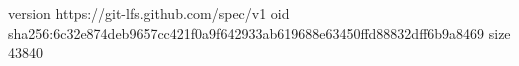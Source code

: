 version https://git-lfs.github.com/spec/v1
oid sha256:6c32e874deb9657cc421f0a9f642933ab619688e63450ffd88832dff6b9a8469
size 43840
